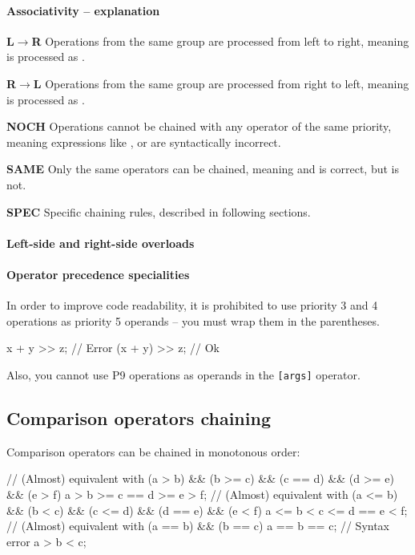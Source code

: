 \paragraph{Associativity -- explanation}
\begin{compactitem}
	\item \textbf{L$\rightarrow$R} Operations from the same group are processed from left to right, meaning  is processed as .
	\item \textbf{R$\rightarrow$L} Operations from the same group are processed from right to left, meaning  is processed as .
	\item \textbf{NOCH} Operations cannot be chained with any operator of the same priority, meaning expressions like ,  or  are syntactically incorrect.
	\item \textbf{SAME} Only the same operators can be chained, meaning  and  is correct, but  is not.
	\item \textbf{SPEC} Specific chaining rules, described in following sections.
\end{compactitem}

\paragraph{Left-side and right-side overloads}

\paragraph{Operator precedence specialities}
In order to improve code readability, it is prohibited to use priority 3 and 4 operations as priority 5 operands -- you must wrap them in the parentheses.
\begin{code}
x + y >> z; // Error
(x + y) >> z; // Ok
\end{code}

Also, you cannot use P9 operations as operands in the \verb|[args]| operator.

\subsection{Comparison operators chaining} Comparison operators can be chained in monotonous order:
\begin{code}
// (Almost) equivalent with (a > b) && (b >= c) && (c == d) && (d >= e) && (e > f)
a > b >= c == d >= e > f;
// (Almost) equivalent with (a <= b) && (b < c) && (c <= d) && (d == e) && (e < f)
a <= b < c <= d == e < f;
// (Almost) equivalent with (a == b) && (b == c)
a == b == c;
// Syntax error
a > b < c;
\end{code}

